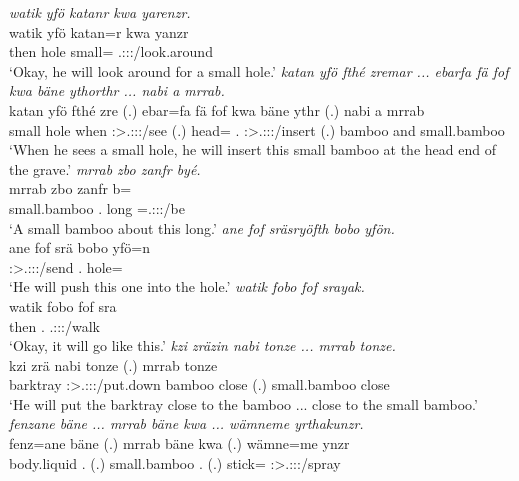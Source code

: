 \begin{exe}
	\emph{watik yfö katanr kwa yarenzr.}\\
	\gll watik yfö katan=r kwa yanzr\\
	then hole small={\Purp} {\Fut} \Tsg.\Masc:\Sbj:\Nonpast:\Ipfv/look.around\\
	\trans `Okay, he will look around for a small hole.'
	\emph{katan yfö fthé zremar ... ebarfa fä fof kwa bäne ythorthr ... nabi a mrrab.}\\
	\gll katan yfö fthé zre (.) ebar=fa fä fof kwa bäne ythr (.) nabi a mrrab\\
	small hole when \Stsg:\Sbj>\Tsg.\F:\Obj:\Irr:\Pfv/see (.) head={\Abl} {\Dist} {\Emph} {\Fut} \Recog.{\Abs} \Stsg:\Sbj>\Tsg.\Masc:\Obj:\Nonpast:\Ipfv/insert (.) bamboo and small.bamboo\\
	\trans `When he sees a small hole, he will insert this small bamboo at the head end of the grave.'
	\emph{mrrab zbo zanfr byé.}\\
	\gll mrrab zbo zanfr b=\\
	small.bamboo{} \Prox.{\All} long \Med=\Tsg.\Masc:\Sbj:\Nonpast:\Ipfv/be\\
	\trans `A small bamboo about this long.'
	\emph{ane fof sräsryöfth bobo yfön.}\\
	\gll ane fof srä bobo yfö=n\\
	{\Dem} {\Emph} \Stsg:\Sbj>\Tsg.\Masc:\Obj:\Irr:\Pfv/send \Med.{\All} hole=\Loc\\
	\trans `He will push this one into the hole.'
	\emph{watik fobo fof srayak.}\\
	\gll watik fobo fof sra\\
	then \Dist.{\All} {\Emph} \Tsg.\Masc:\Sbj:\Irr:\Ipfv/walk\\
	\trans `Okay, it will go like this.'
	\emph{kzi zräzin nabi tonze ... mrrab tonze.}\\
	\gll kzi zrä nabi tonze (.) mrrab tonze\\
	barktray \Stsg:\Sbj>\Tsg.\F:\Obj:\Irr:\Pfv/put.down bamboo close (.) small.bamboo close\\
	\trans `He will put the barktray close to the bamboo ... close to the small bamboo.'
	\emph{fenzane bäne ... mrrab bäne kwa ... wämneme yrthakunzr.}\\
	\gll fenz=ane bäne (.) mrrab bäne kwa (.) wämne=me ynzr\\
	body.liquid \Recog.{\Abs} (.) small.bamboo \Recog.{\Abs} {\Fut} (.) stick={\Ins} \Stsg:\Sbj>\Tsg.\Masc:\Obj:\Nonpast:\Ipfv/spray\\

\end{exe}
